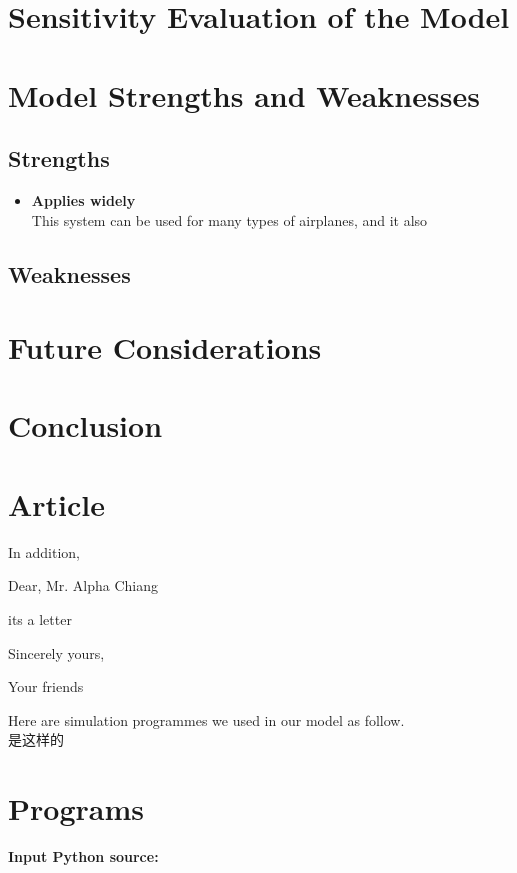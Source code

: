 \documentclass{mcmthesis}
\begin{document}
\section{Sensitivity Evaluation of the Model}
\section{Model Strengths and Weaknesses}
\subsection{Strengths}
\begin{itemize}
\item \textbf{Applies widely}\\
This system can be used for many types of airplanes, and it also
\end{itemize}
\subsection{Weaknesses}

\section{Future Considerations}
\section{Conclusion}

{}



\begin{appendices}

\section{Article}

In addition, 

\begin{letter}{Dear, Mr. Alpha Chiang}

its a letter

\vspace{\parskip}

Sincerely yours,

Your friends

\end{letter}
Here are simulation programmes we used in our model as follow.\\
是这样的


\section{Programs}
\textbf{\textcolor[rgb]{0.98,0.00,0.00}{Input Python source:}}

\end{appendices}
\end{document}
